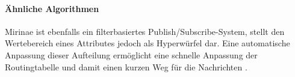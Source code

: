 \paragraph*{Ähnliche Algorithmen}
Mirinae ist ebenfalls ein filterbasiertes Publish/Subscribe-System, stellt den Wertebereich eines Attributes jedoch als Hyperwürfel dar. Eine automatische Anpassung dieser Aufteilung ermöglicht eine schnelle Anpassung der Routingtabelle und damit einen kurzen Weg für die Nachrichten \cite{Choi2005Mirinae}.
